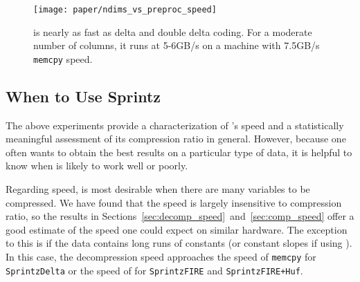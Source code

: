 \begin{figure}[h]
\begin{center}
    \texttt{[image: paper/ndims\_vs\_preproc\_speed]}
    \caption{\fire is nearly as fast as delta and double delta coding. For a moderate number of columns, it runs at 5-6GB/s on a machine with 7.5GB/s \texttt{memcpy} speed.}
    \label{fig:ndims_vs_preproc_speed}
\end{center}
\end{figure}

\subsection{When to Use Sprintz} \label{sec:whenSprintz}


The above experiments provide a characterization of \mine's speed and a statistically meaningful assessment of its compression ratio in general. However, because one often wants to obtain the best results on a particular type of data, it is helpful to know when \minesp is likely to work well or poorly.

Regarding speed, \minesp is most desirable when there are many variables to be compressed. We have found that the speed is largely insensitive to compression ratio, so the results in Sections~\ref{sec:decomp_speed}~and~\ref{sec:comp_speed} offer a good estimate of the speed one could expect on similar hardware. The exception to this is if the data contains long runs of constants (or constant slopes if using \justfire). In this case, the decompression speed approaches the speed of \texttt{memcpy} for \texttt{SprintzDelta} or the speed of \fire for \texttt{SprintzFIRE} and \texttt{SprintzFIRE+Huf}.



